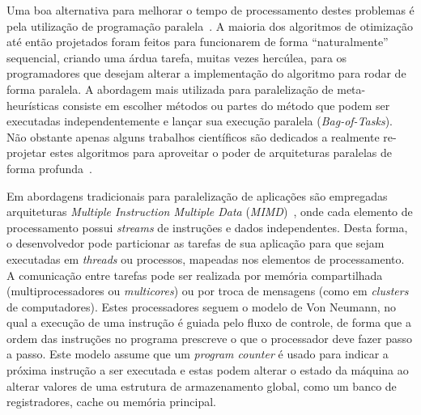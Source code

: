 Uma boa alternativa para melhorar o tempo de processamento destes problemas é pela utilização de programação paralela~\cite{handbookmeta}.
A maioria dos algoritmos de otimização até então projetados foram feitos para funcionarem de forma ``naturalmente'' sequencial, criando uma árdua tarefa, muitas vezes hercúlea, para os programadores que desejam alterar a implementação do algoritmo para rodar de forma paralela.
A abordagem mais utilizada para paralelização de meta-heurísticas consiste em escolher métodos ou partes do método que podem ser executadas independentemente e lançar sua execução paralela (\emph{Bag-of-Tasks}).
Não obstante apenas alguns trabalhos científicos são dedicados a realmente re-projetar estes algoritmos para aproveitar o poder de arquiteturas paralelas de forma profunda~\cite{vns2015, jpdc2017, endm2018:araujo}.

Em abordagens tradicionais para paralelização de aplicações são empregadas arquiteturas \emph{Multiple Instruction Multiple Data} (\emph{MIMD})~\cite{flynn1972}, onde cada elemento de processamento possui \emph{streams} de instruções e dados independentes.
Desta forma, o desenvolvedor pode particionar as tarefas de sua aplicação para que sejam executadas em \emph{threads} ou processos, mapeadas nos elementos de processamento.
A comunicação entre tarefas pode ser realizada por memória compartilhada (multiprocessadores ou \emph{multicores}) ou por troca de mensagens (como em \emph{clusters} de computadores).
Estes processadores seguem o modelo de Von Neumann, no qual a execução de uma instrução é guiada pelo fluxo de controle, de forma que a ordem das instruções no programa prescreve o que o processador deve fazer passo a passo.
Este modelo assume que um \textit{program counter} é usado para indicar a próxima instrução a ser executada e estas podem alterar o estado da máquina ao alterar valores de uma estrutura de armazenamento global, como um banco de registradores, cache ou memória principal.

